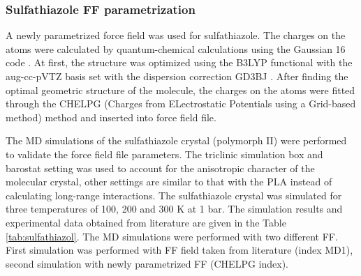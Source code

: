 \subsubsection{Sulfathiazole FF parametrization}
A newly parametrized force field \cite{jorgensen_development_1996} was used for sulfathiazole. The charges on the atoms were calculated by quantum-chemical calculations using the Gaussian 16 code \cite{frisch_gaussian16_2016}. At first, the structure was optimized using the B3LYP functional with the aug-cc-pVTZ basis set with the dispersion correction GD3BJ \cite{smith_revised_2016}. After finding the optimal geometric structure of the molecule, the charges on the atoms were fitted through the CHELPG (Charges from ELectrostatic Potentials using a Grid-based method)\cite{breneman_determining_1990} method and inserted into force field file.
 
The MD simulations of the sulfathiazole crystal (polymorph II) were performed to validate the force field file parameters. The triclinic simulation box and barostat setting was used to account for the anisotropic character of the molecular crystal, other settings are similar to that with the PLA instead of calculating long-range interactions. The sulfathiazole crystal was simulated for three temperatures of 100, 200 and 300 K at 1 bar. The simulation results and experimental data obtained from literature \cite{drebushchak_crystal_2008} are given in the Table \ref{tab:sulfathiazol}. The MD simulations were performed with two different FF. First simulation was performed with FF field taken from literature (index MD1), second simulation with newly parametrized FF (CHELPG index). 
 
